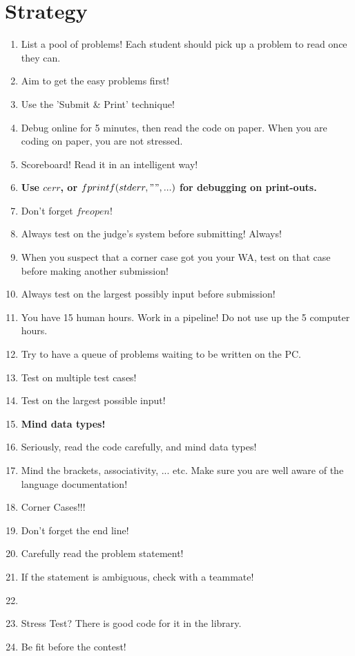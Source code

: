 \documentclass[12pt]{book}
\begin{document}
\section{Strategy}
\begin{enumerate}[label = \roman*.]
\item List a pool of problems! Each student should pick up a problem to read once they can.
\item Aim to get the easy problems first!
\item Use the 'Submit \& Print' technique!
\item Debug online for 5 minutes, then read the code on paper. When you are coding on paper, you are not stressed.
\item Scoreboard! Read it in an intelligent way!
\item \textbf{Use $cerr$, or $fprintf(stderr, "", ...)$ for debugging on print-outs.}
\item Don't forget $freopen$!
\item Always test on the judge's system before submitting! Always!
\item When you suspect that a corner case got you your WA, test on that case before making another submission!
\item Always test on the largest possibly input before submission!
\item You have 15 human hours. Work in a pipeline! Do not use up the 5 computer hours.
\item Try to have a queue of problems waiting to be written on the PC.
\item Test on multiple test cases!
\item Test on the largest possible input!
\item \textbf{Mind data types!}
\item Seriously, read the code carefully, and mind data types!
\item Mind the brackets, associativity, ... etc. Make sure you are well aware of the language documentation!
\item Corner Cases!!!
\item Don't forget the end line!
\item Carefully read the problem statement!
\item If the statement is ambiguous, check with a teammate!
\item 
\item Stress Test? There is good code for it in the library.
\item Be fit before the contest!
\end{enumerate}
\end{document}
